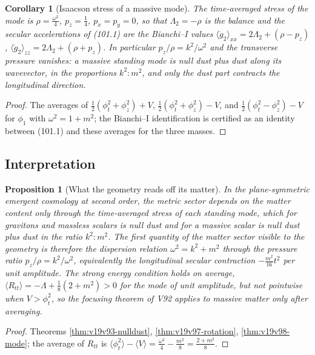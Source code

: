 \documentclass[11pt]{article}
\newtheorem{proposition}[theorem]{Proposition}
\newtheorem{corollary}[theorem]{Corollary}
\theoremstyle{remark}
\begin{document}
\begin{corollary}[Isaacson stress of a massive mode]
\label{cor:v19v98-stress}
The time-averaged stress of the mode is
\(\rho=\tfrac{\omega^2}4\), \(p_z=\tfrac14\), \(p_x=p_y=0\), so that
\(\Lambda_2=-\rho\) is the balance and the secular accelerations of
(101.1) are the Bianchi--I values
\(\langle\ddot g_2\rangle_{xx}=2\Lambda_2+(\rho-p_z)\),
\(\langle\ddot g_2\rangle_{zz}=2\Lambda_2+(\rho+p_z)\).  In particular
\(p_z/\rho=k^2/\omega^2\) and the transverse pressure vanishes: a
massive standing mode is null dust plus dust along its wavevector, in
the proportions \(k^2:m^2\), and only the dust part contracts the
longitudinal direction.
\end{corollary}

\begin{proof}
The averages of \(\tfrac12(\phi_t^2+\phi_z^2)+V\),
\(\tfrac12(\phi_t^2+\phi_z^2)-V\), and \(\tfrac12(\phi_t^2-\phi_z^2)-V\)
for \(\phi_1\) with \(\omega^2=1+m^2\); the Bianchi--I identification
is certified as an identity between (101.1) and these averages for the
three masses.
\end{proof}

\subsection{Interpretation}

\begin{proposition}[What the geometry reads off its matter]
\label{prop:v19v98-reading}
In the plane-symmetric emergent cosmology at second order, the
metric sector depends on the matter content only through the
time-averaged stress of each standing mode, which for gravitons and
massless scalars is null dust and for a massive scalar is null dust
plus dust in the ratio \(k^2:m^2\).  The first quantity of the matter
sector visible to the geometry is therefore the dispersion relation
\(\omega^2=k^2+m^2\) through the pressure ratio \(p_z/\rho=k^2/\omega^2\),
equivalently the longitudinal secular contraction \(-\tfrac{m^2}{16}t^2\)
per unit amplitude.  The strong energy condition holds on average,
\(\langle R_{tt}\rangle=-\Lambda+\tfrac18(2+m^2)>0\) for the mode of
unit amplitude, but not pointwise when \(V>\phi_t^2\), so the
focusing theorem of V92 applies to massive matter only after
averaging.
\end{proposition}

\begin{proof}
Theorems \ref{thm:v19v93-nulldust}, \ref{thm:v19v97-rotation},
\ref{thm:v19v98-mode}; the average of \(R_{tt}\) is
\(\langle\phi_t^2\rangle-\langle V\rangle=\tfrac{\omega^2}4-\tfrac{m^2}8=\tfrac{2+m^2}8\).
\end{proof}
\end{document}
